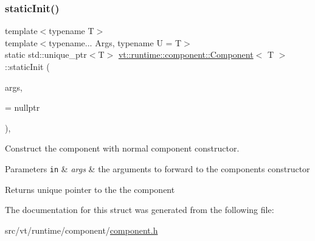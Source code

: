 \subsubsection{\texorpdfstring{static\+Init()}{staticInit()}\hspace{0.1cm}{\footnotesize\ttfamily [2/2]}}
{\footnotesize\ttfamily template$<$typename T$>$ \\
template$<$typename... Args, typename U  = T$>$ \\
static std\+::unique\+\_\+ptr$<$T$>$ \hyperlink{structvt_1_1runtime_1_1component_1_1_component}{vt\+::runtime\+::component\+::\+Component}$<$ T $>$\+::static\+Init (\begin{DoxyParamCaption}\item[{Args \&\&...}]{args,  }\item[{\hyperlink{structvt_1_1runtime_1_1component_1_1_component_a389e53dbfc20013d66ef09d4f42c0a53}{has\+No\+Cons}$<$ U $>$ $\ast$}]{ = {\ttfamily nullptr} }\end{DoxyParamCaption})\hspace{0.3cm}{\ttfamily [inline]}, {\ttfamily [static]}}



Construct the component with normal component constructor. 


\begin{DoxyParams}[1]{Parameters}
\mbox{\tt in}  & {\em args} & the arguments to forward to the component\textquotesingle{}s constructor\\
\hline
\end{DoxyParams}
\begin{DoxyReturn}{Returns}
unique pointer to the the component 
\end{DoxyReturn}


The documentation for this struct was generated from the following file\+:\begin{DoxyCompactItemize}
\item 
src/vt/runtime/component/\hyperlink{component_8h}{component.\+h}\end{DoxyCompactItemize}
